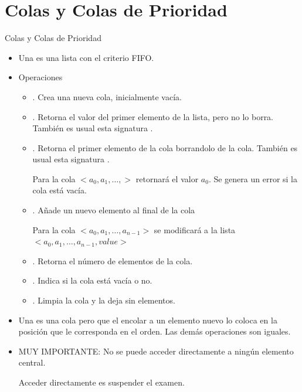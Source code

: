 \documentclass[10pt,envcountsect,spanish]{beamer}
\begin{document}
\section{Colas y Colas de Prioridad}

\begin{frame}{Colas y Colas de Prioridad}

\begin{itemize}
\item Una  es una lista con el criterio FIFO.

\item Operaciones
\begin{itemize}
\item {}. Crea una nueva cola, inicialmente vacía.

\item {}. Retorna el valor del primer elemento de la lista, pero no lo borra.  También es usual esta signatura .

\item {}. Retorna el primer elemento de la cola borrandolo de la cola. También es usual esta signatura  .

Para la cola  $<a_0, a_1, \ldots,>$ retornará el valor $a_0$.
Se genera un error si la cola está vacía.

\item {}.
Añade un nuevo elemento al final de la cola

Para la cola  $<a_0, a_1, \ldots, a_{n-1}>$ 
se modificará a la lista $<a_0, a_1, \ldots, a_{n-1}, value>$ 

\item {}. Retorna el número de elementos de la cola.

\item {}. Indica si la cola está vacía o no.

\item {}. Limpia la cola y la deja sin elementos.

\end{itemize}

\item Una  es una cola pero que el encolar a un elemento nuevo lo coloca en la posición que le corresponda en el orden. Las demás operaciones son iguales.


\item MUY IMPORTANTE: No se puede acceder directamente a ningún elemento central.

Acceder directamente es suspender el examen.

\end{itemize}

\end{frame}
\end{document}
